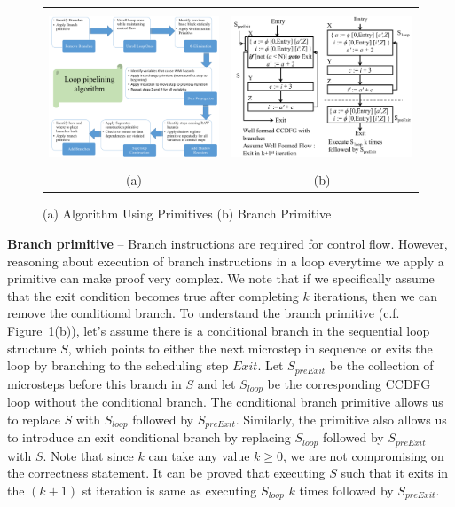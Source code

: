 \begin{figure}
\begin{center}
\begin{tabular}{cc}
\includegraphics[height=1.8in]{fig-proposal/algorithm-using-primitives}
& 
\includegraphics[height=1.8in]{fig-proposal/conditional-branch-primitive}
\\
(a) &  (b) 
\end{tabular}
\end{center}
\caption{(a) Algorithm Using Primitives (b) Branch Primitive}
\label{fig:branch-primitive}
\end{figure}

{\textbf {Branch primitive}} -- Branch instructions are required for control flow. However, reasoning about 
execution of branch instructions in a loop everytime we apply a primitive can make proof very complex.
We note that if we specifically assume that the exit condition becomes true after completing $k$ iterations, then we can remove the conditional branch.
To understand the branch primitive (c.f. Figure~\ref{fig:branch-primitive}(b)), 
let's assume there is a conditional branch in the sequential loop structure $S$, which points to either
the next microstep in sequence or exits the loop by branching to the scheduling step
$Exit$. Let $S_{preExit}$ be the collection of microsteps before this branch in $S$ and
let $S_{loop}$ be the corresponding CCDFG loop without the conditional branch.
The conditional branch primitive allows us to replace $S$ with $S_{loop}$ followed by
$S_{preExit}$. Similarly,
the primitive also allows us to introduce an exit conditional branch by replacing
$S_{loop}$ followed by $S_{preExit}$ with $S$.
Note that since $k$ can take any value $k \ge 0$, we are not compromising on the correctness statement.  
It can be proved that executing $S$ such that it exits in the $(k+1)$ st
iteration is same as executing $S_{loop}$ $k$ times followed by $S_{preExit}$.

